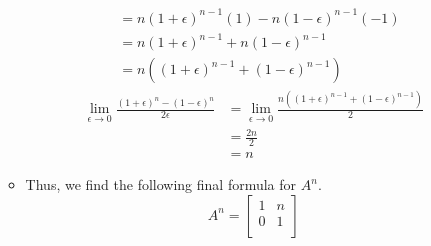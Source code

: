 \documentclass{article}
\begin{document}
\begin{itemize}
\begin{itemize}
\begin{align*}
            &= n(1+\epsilon)^{n-1}(1)-n(1-\epsilon)^{n-1}(-1)\\
            &= n(1+\epsilon)^{n-1}+n(1-\epsilon)^{n-1}\\
            &= n\left( (1+\epsilon)^{n-1}+(1-\epsilon)^{n-1} \right)
        \end{align*}
        \begin{align*}
            \lim_{\epsilon\to 0} \frac{(1+\epsilon)^n-(1-\epsilon)^n}{2\epsilon} &= \lim_{\epsilon\to 0} \frac{n\left( (1+\epsilon)^{n-1}+(1-\epsilon)^{n-1} \right)}{2}\\
            &= \frac{2n}{2}\\
            &= n
        \end{align*}
        \item Thus, we find the following final formula for $A^n$.
        \begin{equation*}
            A^n =
            \begin{bmatrix}
                1 & n\\
                0 & 1\\
            \end{bmatrix}
        \end{equation*}
    \end{itemize}
\end{itemize}
\end{document}
